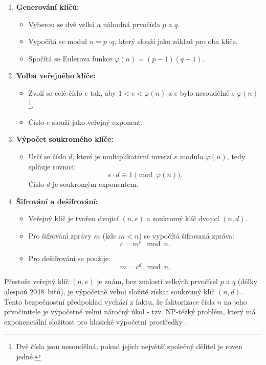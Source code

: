 \begin{enumerate}
  \item \textbf{Generování klíčů:}
    \begin{itemize}
      \item Vyberou se dvě velká a náhodná prvočísla \( p \) a \( q \).
      \item Vypočítá se modul \( n = p \cdot q \), který slouží jako základ pro oba klíče.
      \item Spočítá se Eulerova funkce \(\varphi(n) = (p-1)(q-1)\).
    \end{itemize}

  \item \textbf{Volba veřejného klíče:}
    \begin{itemize}
      \item Zvolí se celé číslo \( e \) tak, aby \( 1 < e < \varphi(n) \) a \( e \) bylo nesoudělné s \(\varphi(n)\)\footnote{Dvě čísla jsou nesoudělná, pokud jejich největší společný dělitel je roven jedné.}.
      \item Číslo \( e \) slouží jako veřejný exponent.
    \end{itemize}
  
  \item \textbf{Výpočet soukromého klíče:}
    \begin{itemize}
      \item Určí se číslo \( d \), které je multiplikativní inverzí \( e \) modulo \(\varphi(n)\), tedy splňuje rovnici:
      \[
      e \cdot d \equiv 1 \pmod{\varphi(n)}.
      \]
      Číslo \( d \) je soukromým exponentem.
    \end{itemize}
  
  \item \textbf{Šifrování a dešifrování:}
    \begin{itemize}
      \item Veřejný klíč je tvořen dvojicí \((n, e)\) a soukromý klíč dvojicí \((n, d)\).
      \item Pro šifrování zprávy \( m \) (kde \( m < n \)) se vypočítá šifrovaná zpráva:
      \[
      c = m^e \mod n.
      \]
      \item Pro dešifrování se použije:
      \[
      m = c^d \mod n.
      \]
    \end{itemize}
\end{enumerate}

Přestože veřejný klíč \((n, e)\) je znám, bez znalosti velkých prvočísel \( p \) a \( q \) (délky alespoň 2048~bitů), je výpočetně velmi složité získat soukromý klíč \((n, d)\). Tento bezpečnostní předpoklad vychází z faktu, že faktorizace čísla \( n \) na jeho prvočinitele je výpočetně velmi náročný úkol - tzv. NP-těžký problém, který má exponenciální složitost pro klasické výpočetní prostředky \parencite{tesar2021}.  

